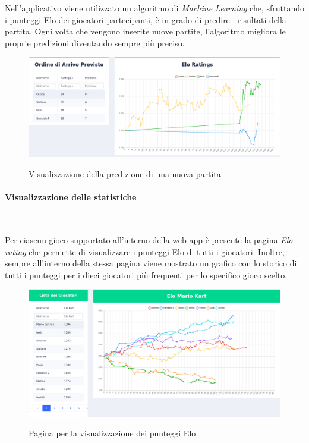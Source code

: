 		\noindent Nell'applicativo viene utilizzato un algoritmo di \emph{Machine Learning} che, sfruttando i punteggi \gls{Elo} dei giocatori partecipanti, è in grado di predire i risultati della partita.
		Ogni volta che vengono inserite nuove partite, l'algoritmo migliora le proprie predizioni diventando sempre più preciso. 
		
		\begin{figure}[H]
			\centering
			\includegraphics[width=\textwidth]{immagini/predizione.png} \\
			\caption{\label{fig:predizione} Visualizzazione della predizione di una nuova partita}
		\end{figure}
		
		\paragraph{Visualizzazione delle statistiche} ~\smallskip 
		
		\noindent Per ciascun gioco supportato all'interno della web app è presente la pagina \emph{\gls{Elo} rating}
		che permette di visualizzare i punteggi \gls{Elo} di tutti i giocatori. Inoltre, sempre all'interno della stessa 
		pagina viene mostrato un grafico con lo storico di tutti i punteggi per i dieci giocatori più frequenti per 
		lo specifico gioco scelto.
		
		\begin{figure}[H]
			\centering
			\includegraphics[width=\textwidth]{immagini/elo.png} \\
			\caption{\label{fig:elo} Pagina per la visualizzazione dei punteggi Elo}
		\end{figure}
		

